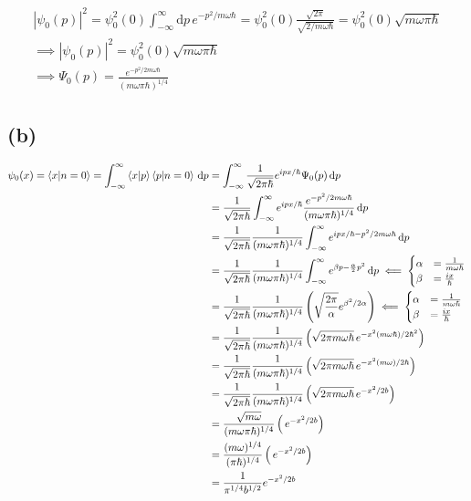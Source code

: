 \documentclass[letter, 10pts]{article}
\newcommand{\hb}{\hbar}
\begin{document}
\begin{align*}
	| \psi_0(p)| ^2 =
\psi_0^2(0) \int_{-\infty}^{\infty} \mathrm{d} p \, 
e^{-p^2 / m \omega \hb} = \psi_0^2(0)  \frac{\sqrt{2 \pi } }{\sqrt{2 / m \omega \hb} } 
= \psi_0^2(0) \sqrt{m \omega \pi \hb} \\ 
\implies 
|\psi_0(p)|^2 = \psi_0^2(0) \sqrt{m \omega \pi \hb} \\ 
\implies
\Psi_0(p) = \frac{e^{-p^2 / 2 m \omega \hb } }{(m \omega \pi \hb)^{1 / 4} }
\end{align*}




\subsection*{(b)}
\begin{align*}
\psi_0(x) = 
\braket{x | n = 0} = 
\int_{-\infty}^{\infty} \braket{x | p} \braket{p | n = 0} \, \mathrm{d} p  &= 
\int_{-\infty}^{\infty} \frac{1}{\sqrt{2 \pi \hb}}e^{i p x / \hb} 
\Psi_0(p)
\, \mathrm{d} p  \\ 
&=  \frac{1}{\sqrt{2 \pi \hb}}\int_{-\infty}^{\infty} e^{i p x / \hb} 
\frac{e^{-p^2 / 2 m \omega \hb } }{(m \omega \pi \hb)^{1 / 4} }
\, \mathrm{d} p  \\ 
&= \frac{1}{\sqrt{2 \pi \hb}}\frac{1}{(m \omega \pi \hb)^{1 / 4}} \int_{-\infty}^{\infty} e^{i p x / \hb
{-p^2 / 2 m \omega \hb }} 
\, \mathrm{d} p  \\ 
&= \frac{1}{\sqrt{2 \pi \hb}}\frac{1}{(m \omega \pi \hb)^{1 / 4}} 
\int_{-\infty}^{\infty} 
e^{\beta p 
{- \frac{\alpha}{2} p^2 }} 
\, \mathrm{d} p  
\impliedby 
\begin{cases}
	\alpha &= \frac{1}{m \omega \hb } \\
	\beta &= \frac{ix}{\hb} \\
\end{cases}
\\ 
&= \frac{1}{\sqrt{2 \pi \hb}}\frac{1}{(m \omega \pi \hb)^{1 / 4}} 
\left(
\sqrt{\frac{2\pi}{\alpha}}  e^{\beta^2 / 2 \alpha}
\right)
\impliedby 
\begin{cases}
	\alpha &= \frac{1}{m \omega \hb } \\
	\beta &= \frac{ix}{\hb} \\
\end{cases} \\ 
&= \frac{1}{\sqrt{2 \pi \hb}}\frac{1}{(m \omega \pi \hb)^{1 / 4}} 
\left(
	\sqrt{2 \pi m \omega \hb }  \, 
e^{- x ^2 (m \omega \hb )/ 2 \hb^2}
\right)\\ 
&= \frac{1}{\sqrt{2 \pi \hb}}\frac{1}{(m \omega \pi \hb)^{1 / 4}} 
\left(
	\sqrt{2 \pi m \omega \hb }  \, 
e^{- x ^2 (m \omega )/ 2 \hb}
\right) \\ 
&= \frac{1}{\sqrt{2 \pi \hb}}\frac{1}{(m \omega \pi \hb)^{1 / 4}} 
\left(
	\sqrt{2 \pi m \omega \hb }  \, 
e^{- x ^2/ 2 b}
\right) \\ 
&= \frac{\sqrt{m \omega } }{(m \omega \pi \hb)^{1 / 4}} 
\left(\, 
e^{- x ^2/ 2 b}
\right) \\ 
&= \frac{({m \omega } )^{1 / 4}}{(\pi \hb)^{1 / 4}} 
\left(\, 
e^{- x ^2/ 2 b}
\right) \\ 
&= 
\frac{1}{\pi^{1 / 4} b^{ 1 / 2}}
e^{- x ^2/ 2 b}
\end{align*}
\end{document}
